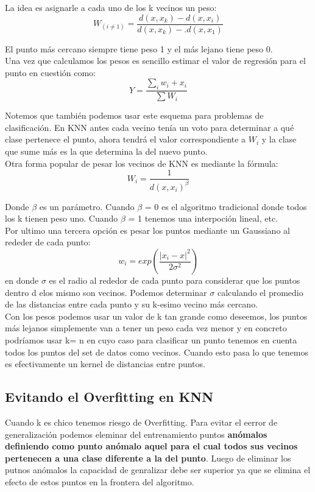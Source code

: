 \documentclass[titlepage,a4paper]{article}
\begin{document}
La idea es asignarle a cada uno de los k vecinos un peso: $$W_(i\neq1) = \frac{d(x,x_k) - d(x,x_i)}{d(x,x_k) - .d(x,x_1)} $$

El punto más cercano siempre tiene peso 1 y el más lejano tiene peso 0. \\

Una vez que calculamos los pesos es sencillo estimar el valor de regresión para el punto en cuestión como: $$ Y= \frac{\sum_i w_i + x_i}{\sum W_i} $$

Notemos que también podemos usar este esquema para problemas de clasificación. En KNN antes cada vecino tenía un voto para determinar a qué clase pertenece el punto, ahora tendrá el valor correspondiente a $W_i$ y la clase que sume más es la que determina la del nuevo punto. \\

Otra forma popular de pesar los vecinos de KNN es mediante la fórmula: $$ W_i = \frac{1}{d(x,x_i)^\beta}$$

Donde $\beta$ es un parámetro. Cuando $\beta$ = 0  es el algoritmo tradicional donde todos los k tienen peso uno. Cuando $\beta$ = 1 tenemos una interpoción lineal, etc. \\

Por ultimo una tercera opción es pesar los puntos mediante un Gaussiano al rededer de cada punto: $$w_i = exp\left(\frac{|x_i -x|^2}{2\sigma^2}\right)$$
en donde $\sigma$ es el radio al rededor de cada punto para considerar que los puntos dentro d elos mismo son vecinos. Podemos determinar $\sigma$ calculando el promedio de las distancias entre cada punto y su k-esimo vecino más cercano. \\

Con los pesos podemos usar un valor de k tan grande como deseemos, los puntos más lejanos simplemente van a tener un peso cada vez menor y en concreto podríamos usar k= n en cuyo caso para clasificar un punto tenemos en cuenta todos los puntos del set de datos como vecinos. Cuando esto pasa lo que tenemos es efectivamente un kernel de distancias entre puntos. 

\subsection*{Evitando el Overfitting en KNN}
Cuando k es chico tenemos riesgo de Overfitting. Para evitar el eerror de generalización podemos eleminar del entrenamiento puntos \textbf{anómalos definiendo como punto anómalo aquel  para el cual todos sus vecinos pertenecen a una clase diferente a la del punto}. Luego de eliminar los putnos anómalos la capacidad de genralizar debe ser superior ya que se elimina el efecto de estos puntos en la frontera del algoritmo. 
\end{document}
